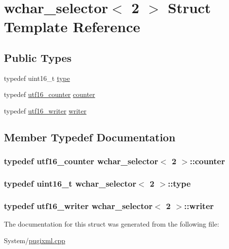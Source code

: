 \hypertarget{structwchar__selector_3_012_01_4}{\section{wchar\-\_\-selector$<$ 2 $>$ Struct Template Reference}
\label{structwchar__selector_3_012_01_4}
}
\subsection*{Public Types}
\begin{DoxyCompactItemize}
\item 
typedef uint16\-\_\-t \hyperlink{structwchar__selector_3_012_01_4_a60517f9b159ad60977ca7c3d2739c168}{type}
\item 
typedef \hyperlink{structutf16__counter}{utf16\-\_\-counter} \hyperlink{structwchar__selector_3_012_01_4_a108682c81b16127f3bec2501f02cb9d8}{counter}
\item 
typedef \hyperlink{structutf16__writer}{utf16\-\_\-writer} \hyperlink{structwchar__selector_3_012_01_4_af84979f9b8cd883798fe4e99820d6073}{writer}
\end{DoxyCompactItemize}


\subsection{Member Typedef Documentation}
\hypertarget{structwchar__selector_3_012_01_4_a108682c81b16127f3bec2501f02cb9d8}{
\subsubsection[{counter}]{\setlength{\rightskip}{0pt plus 5cm}typedef {\bf utf16\-\_\-counter} {\bf wchar\-\_\-selector}$<$ 2 $>$\-::{\bf counter}}}\label{structwchar__selector_3_012_01_4_a108682c81b16127f3bec2501f02cb9d8}
\hypertarget{structwchar__selector_3_012_01_4_a60517f9b159ad60977ca7c3d2739c168}{
\subsubsection[{type}]{\setlength{\rightskip}{0pt plus 5cm}typedef uint16\-\_\-t {\bf wchar\-\_\-selector}$<$ 2 $>$\-::{\bf type}}}\label{structwchar__selector_3_012_01_4_a60517f9b159ad60977ca7c3d2739c168}
\hypertarget{structwchar__selector_3_012_01_4_af84979f9b8cd883798fe4e99820d6073}{
\subsubsection[{writer}]{\setlength{\rightskip}{0pt plus 5cm}typedef {\bf utf16\-\_\-writer} {\bf wchar\-\_\-selector}$<$ 2 $>$\-::{\bf writer}}}\label{structwchar__selector_3_012_01_4_af84979f9b8cd883798fe4e99820d6073}


The documentation for this struct was generated from the following file\-:\begin{DoxyCompactItemize}
\item 
System/\hyperlink{pugixml_8cpp}{pugixml.\-cpp}\end{DoxyCompactItemize}
